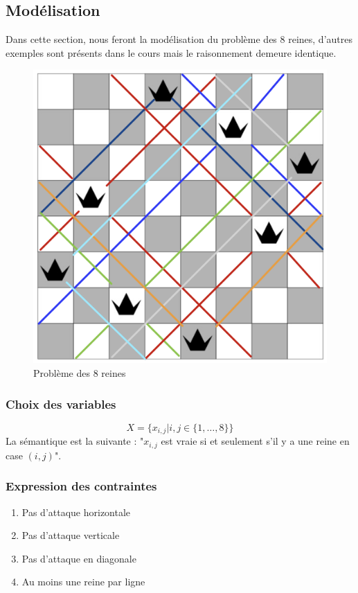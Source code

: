 \subsection{Modélisation}
Dans cette section, nous feront la modélisation du problème des 8 reines, d'autres exemples sont présents dans le cours mais le raisonnement demeure identique.
\begin{figure}[H]
    \centering
    \includegraphics[scale=0.3]{pictures/prob8reines.png}
    \caption{Problème des 8 reines}
    \label{fig:8reines}
\end{figure}
\subsubsection{Choix des variables}
\begin{equation*}
    X = \{x_{i,j} | i,j \in \{1,\dots,8\}\}
\end{equation*}
La sémantique est la suivante : "$x_{i,j}$ est vraie si et seulement s'il y a une reine en case $(i,j)$".

\subsubsection{Expression des contraintes}
\begin{enumerate}
    \item Pas d'attaque horizontale
    \item Pas d'attaque verticale
    \item Pas d'attaque en diagonale
    \item Au moins une reine par ligne
\end{enumerate}


